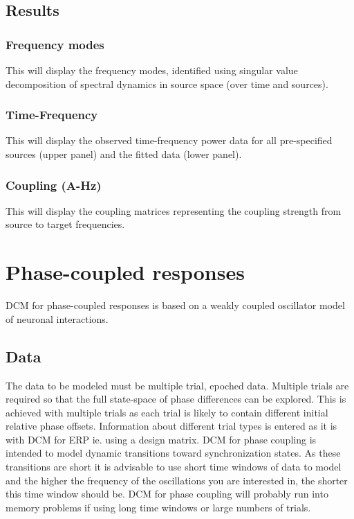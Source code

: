 \subsection{Results}

\subsubsection{Frequency modes}
This will display the frequency modes, identified using singular value decomposition of spectral dynamics in source space (over time and sources).

\subsubsection{Time-Frequency}
This will display the observed time-frequency power data for all pre-specified sources (upper panel) and the fitted data (lower panel).

\subsubsection{Coupling (A-Hz)}
This will display the coupling matrices representing the coupling strength from source to target frequencies.

\section{Phase-coupled responses}

DCM for phase-coupled responses is based on a weakly coupled oscillator model of neuronal interactions. 

\subsection{Data}
The data to be modeled must be multiple trial, epoched data. Multiple trials are required so that the full state-space of phase differences can be explored. This is achieved with multiple trials as each trial is likely to contain different initial relative phase offsets. Information about different trial types is entered as it is with DCM for ERP ie. using a design matrix. DCM for phase coupling is intended to model dynamic transitions toward synchronization states. As these transitions are short it is advisable to use short time windows of data to model and the higher the frequency of the oscillations you are interested in, the shorter this time window should be. DCM for phase coupling will probably run into memory problems if using long time windows or large numbers of trials.

